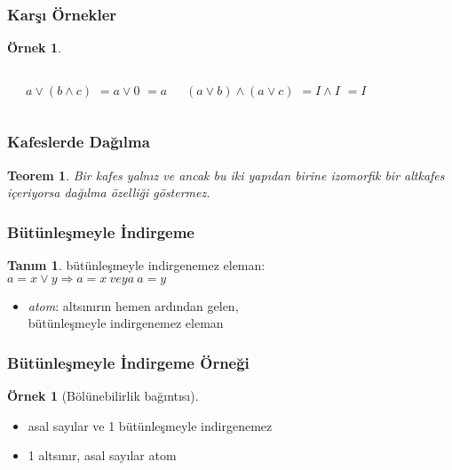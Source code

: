 \documentclass[dvipsnames]{beamer}
\theoremstyle{definition}
\newtheorem{tanim}[theorem]{Tanım}
\theoremstyle{example}
\newtheorem{ornek}[theorem]{Örnek}
\theoremstyle{plain}
\newtheorem{teorem}[theorem]{Teorem}
\begin{document}
\begin{frame}
  \frametitle{Karşı Örnekler}

  \begin{ornek}
    \begin{columns}
      \begin{center}
      \end{center}

      \pause
      $a \vee (b \wedge c)$ \pause $= a \vee 0$ \pause $= a$

      \pause
      $(a \vee b) \wedge (a \vee c)$ \pause $= I \wedge I$ \pause $= I$
    \end{columns}
  \end{ornek}
\end{frame}

\begin{frame}
  \frametitle{Kafeslerde Dağılma}

  \begin{teorem}
    Bir kafes yalnız ve ancak bu iki yapıdan birine izomorfik bir altkafes içeriyorsa dağılma
    özelliği göstermez.
  \end{teorem}
\end{frame}

\begin{frame}
  \frametitle{Bütünleşmeyle İndirgeme}

  \begin{tanim}
    \alert{bütünleşmeyle indirgenemez eleman}:\\
    $a = x \vee y \Rightarrow a = x ~veya~ a = y$
  \end{tanim}

  \pause
  \medskip
  \begin{itemize}
    \item \emph{atom}: altsınırın hemen ardından gelen,\\
      bütünleşmeyle indirgenemez eleman
  \end{itemize}
\end{frame}

\begin{frame}
  \frametitle{Bütünleşmeyle İndirgeme Örneği}

  \begin{ornek}[Bölünebilirlik bağıntısı]
    \begin{itemize}
      \item asal sayılar ve 1 bütünleşmeyle indirgenemez

      \pause
      \medskip
      \item 1 altsınır, asal sayılar atom
    \end{itemize}
  \end{ornek}
\end{frame}
\end{document}
